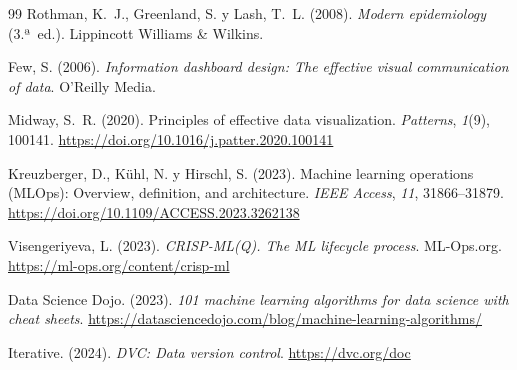 \documentclass[11pt,a4paper]{article}
\begin{document}
\begin{thebibliography}{99}
Rothman, K.~J., Greenland, S. y Lash, T.~L. (2008).
\newblock \emph{Modern epidemiology} (3.ª~ed.).
\newblock Lippincott Williams \& Wilkins.

Few, S. (2006).
\newblock \emph{Information dashboard design: The effective visual communication of data}.
\newblock O'Reilly Media.

Midway, S.~R. (2020).
\newblock Principles of effective data visualization.
\newblock \emph{Patterns}, \emph{1}(9), 100141.
\newblock \url{https://doi.org/10.1016/j.patter.2020.100141}

Kreuzberger, D., Kühl, N. y Hirschl, S. (2023).
\newblock Machine learning operations (MLOps): Overview, definition, and architecture.
\newblock \emph{IEEE Access}, \emph{11}, 31866--31879.
\newblock \url{https://doi.org/10.1109/ACCESS.2023.3262138}

Visengeriyeva, L. (2023).
\newblock \emph{CRISP-ML(Q). The ML lifecycle process}.
\newblock ML-Ops.org.
\newblock \url{https://ml-ops.org/content/crisp-ml}

Data Science Dojo. (2023).
\newblock \emph{101 machine learning algorithms for data science with cheat sheets}.
\newblock \url{https://datasciencedojo.com/blog/machine-learning-algorithms/}

Iterative. (2024).
\newblock \emph{DVC: Data version control}.
\newblock \url{https://dvc.org/doc}

\end{thebibliography}
\endgroup
\end{document}
